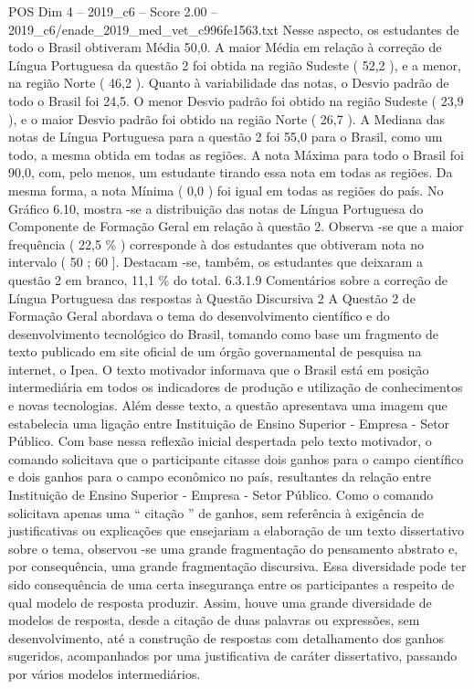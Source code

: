 \begin{textsample}{POS Dim 4 – 2019\_c6 – Score 2.00 – 2019\_c6/enade\_2019\_med\_vet\_c996fe1563.txt}
Nesse aspecto, os estudantes de todo o Brasil obtiveram Média 50,0.
A maior Média em relação à correção de Língua Portuguesa da questão 2 foi obtida na região Sudeste ( 52,2 ), e a menor, na região Norte ( 46,2 ).
Quanto à variabilidade das notas, o Desvio padrão de todo o Brasil foi 24,5.
O menor Desvio padrão foi obtido na região Sudeste ( 23,9 ), e o maior Desvio padrão foi obtido na região Norte ( 26,7 ).
A Mediana das notas de Língua Portuguesa para a questão 2 foi 55,0 para o Brasil, como um todo, a mesma obtida em todas as regiões.
A nota Máxima para todo o Brasil foi 90,0, com, pelo menos, um estudante tirando essa nota em todas as regiões.
Da mesma forma, a nota Mínima ( 0,0 ) foi igual em todas as regiões do país.
No Gráfico 6.10, mostra -se a distribuição das notas de Língua Portuguesa do Componente de Formação Geral em relação à questão 2.
Observa -se que a maior frequência ( 22,5 \% ) corresponde à dos estudantes que obtiveram nota no intervalo ( 50 ; 60 ].
Destacam -se, também, os estudantes que deixaram a questão 2 em branco, 11,1 \% do total. 6.3.1.9 Comentários sobre a correção de Língua Portuguesa das respostas à Questão Discursiva 2 A Questão 2 de Formação Geral abordava o tema do desenvolvimento científico e do desenvolvimento tecnológico do Brasil, tomando como base um fragmento de texto publicado em site oficial de um órgão governamental de pesquisa na internet, o Ipea.
O texto motivador informava que o Brasil está em posição intermediária em todos os indicadores de produção e utilização de conhecimentos e novas tecnologias.
Além desse texto, a questão apresentava uma imagem que estabelecia uma ligação entre Instituição de Ensino Superior - Empresa - Setor Público.
Com base nessa reflexão inicial despertada pelo texto motivador, o comando solicitava que o participante citasse dois ganhos para o campo científico e dois ganhos para o campo econômico no país, resultantes da relação entre Instituição de Ensino Superior - Empresa - Setor Público.
Como o comando solicitava apenas uma “ citação ” de ganhos, sem referência à exigência de justificativas ou explicações que ensejariam a elaboração de um texto dissertativo sobre o tema, observou -se uma grande fragmentação do pensamento abstrato e, por consequência, uma grande fragmentação discursiva.
Essa diversidade pode ter sido consequência de uma certa insegurança entre os participantes a respeito de qual modelo de resposta produzir.
Assim, houve uma grande diversidade de modelos de resposta, desde a citação de duas palavras ou expressões, sem desenvolvimento, até a construção de respostas com detalhamento dos ganhos sugeridos, acompanhados por uma justificativa de caráter dissertativo, passando por vários modelos intermediários.

\end{textsample}
